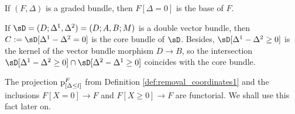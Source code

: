\begin{Example}
If $(F, \Delta)$ is a graded bundle, then $F[\Delta=0]$ is the base of $F$.
\end{Example}
\begin{Example} \label{exmpl:core} If $\sD = (D; \Delta^1, \Delta^2)= (D; A, B; M)$ is a double vector bundle, then $C:=\sD[\Delta^1-\Delta^2=0]$ is the core bundle of $\sD$. Besides, $\sD[\Delta^1-\Delta^2\geq 0]$ is the kernel of the vector bundle morphism $D\rightarrow B$, so the intersection $\sD[\Delta^1-\Delta^2\geq 0]\cap \sD[\Delta^2-\Delta^1\geq 0]$ coincides with the core bundle.
\end{Example}

\begin{Remark} The projection $\textnormal{p}^F_{[\Delta \leq l]}$ from Def\/inition \ref{def:removal_coordinates1} and the inclusions
$F[X=0] \rightarrow F$ and $F[X\geq 0] \rightarrow F$ are functorial. We shall use this fact later on.
\end{Remark}


